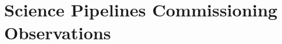 \section{Science Pipelines Commissioning Observations}
\label{sec:science_pipelines_commissioning_observations}
